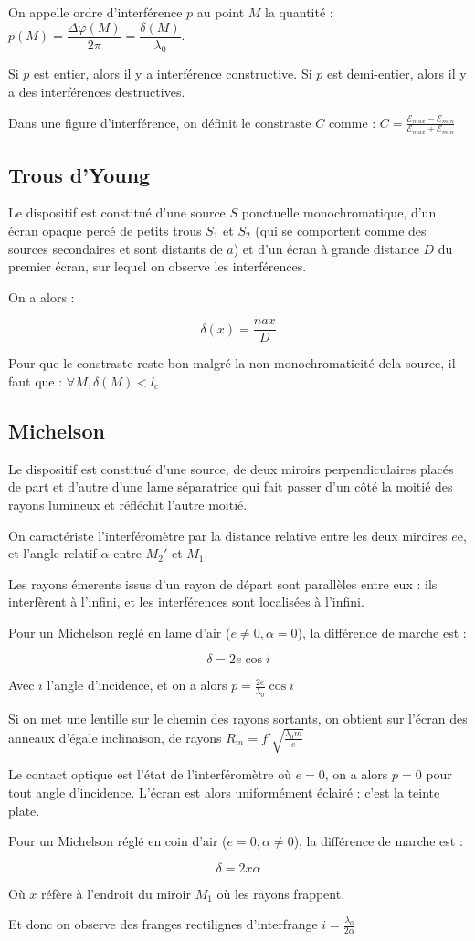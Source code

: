 \documentclass[a4paper,12pt]{book}
\newcommand{\Def}[2]{\begin{tcolorbox}[colback=white,colframe=red!10!green!20!blue!75!, title=Définition : #1]#2\end{tcolorbox}}
\newcommand{\Thr}[2]{\begin{tcolorbox}[sharp corners, colback=white,colframe=red!10!blue!30!green!75!, title=Théorème : #1]#2\end{tcolorbox}}
\begin{document}
\Def{Ordre d'interférence}{On appelle ordre d'interférence $p$ au point $M$ la quantité : $p(M) = \dfrac{\Delta\varphi(M)}{2\pi} =\dfrac{\delta(M)}{\lambda_0}$.
\par Si $p$ est entier, alors il y a interférence constructive. Si $p$ est demi-entier, alors il y a des interférences destructives.
\par Dans une figure d'interférence, on définit le constraste $C$ comme : $C=\frac{\mathcal{E}_{max}-\mathcal{E}_{min}}{\mathcal{E}_{max}+\mathcal{E}_{min}}$}


\subsection{Trous d'Young}
\Def{Dispositif}{Le dispositif est constitué d'une source $S$ ponctuelle monochromatique, d'un écran opaque percé de petits trous $S_1$ et $S_2$ (qui se comportent comme des sources secondaires et sont distants de $a$) et d'un écran à grande distance $D$ du premier écran, sur lequel on observe les interférences.
\par On a alors :
\par $$\delta(x) =\frac{nax}{D}$$
\par Pour que le constraste reste bon malgré la non-monochromaticité dela source, il faut que : $\forall M, \delta(M)<l_c$}

\subsection{Michelson}
\Def{Dispositif}{Le dispositif est constitué d'une source, de deux miroirs perpendiculaires placés de part et d'autre d'une lame séparatrice qui fait passer d'un côté la moitié des rayons lumineux et réfléchit l'autre moitié.
\par On caractériste l'interféromètre par la distance relative entre les deux miroires $e$e, et l'angle relatif $\alpha$ entre $M_2'$ et $M_1$.
\par Les rayons émerents issus d'un rayon de départ sont parallèles entre eux : ils interfèrent à l'infini, et les interférences sont localisées à l'infini.}
\Thr{Lame d'air}{Pour un Michelson reglé en lame d'air ($e\neq 0, \alpha =0$), la différence de marche est :
\par $$\delta = 2e\cos i$$
\par Avec $i$ l'angle d'incidence, et on a alors $p=\frac{2e}{\lambda_0}\cos i$
\par Si on met une lentille sur le chemin des rayons sortants, on obtient sur l'écran des anneaux d'égale inclinaison, de rayons $R_m = f'\sqrt{\frac{\lambda_0m}{e}}$
\par Le contact optique est l'état de l'interféromètre où $e=0$, on a alors $p=0$ pour tout angle d'incidence. L'écran est alors uniformément éclairé : c'est la teinte plate.}
\Thr{Coin d'air}{Pour un Michelson réglé en coin d'air ($e=0, \alpha\neq0$), la différence de marche est :
\par $$\delta = 2x\alpha$$
\par Où $x$ réfère à l'endroit du miroir $M_1$ où les rayons frappent.
\par Et donc on observe des franges rectilignes d'interfrange $i = \frac{\lambda_0}{2\alpha}$}
\end{document}
